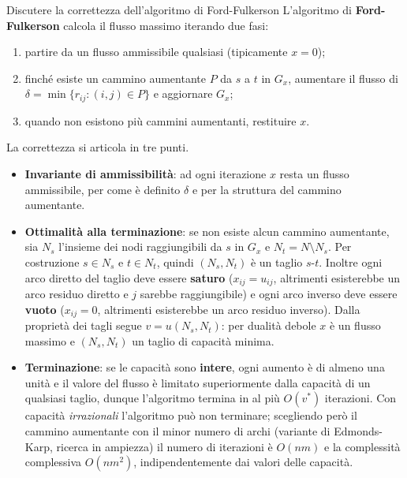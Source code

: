 \documentclass[12pt]{extarticle} %
\begin{document}
\begin{teoriabox}{Discutere la correttezza dell'algoritmo di Ford-Fulkerson}
L'algoritmo di \textbf{Ford-Fulkerson} calcola il flusso massimo iterando due fasi:
\begin{enumerate}
    \item partire da un flusso ammissibile qualsiasi (tipicamente $x = 0$);
    \item finché esiste un cammino aumentante $P$ da $s$ a $t$ in $G_x$, aumentare il flusso di $\delta = \min\{r_{ij} : (i,j) \in P\}$ e aggiornare $G_x$;
    \item quando non esistono più cammini aumentanti, restituire $x$.
\end{enumerate}
La correttezza si articola in tre punti.
\begin{itemize}
    \item \textbf{Invariante di ammissibilità}: ad ogni iterazione $x$ resta un flusso ammissibile, per come è definito $\delta$ e per la struttura del cammino aumentante.
    \item \textbf{Ottimalità alla terminazione}: se non esiste alcun cammino aumentante, sia $N_s$ l'insieme dei nodi raggiungibili da $s$ in $G_x$ e $N_t = N \setminus N_s$. Per costruzione $s \in N_s$ e $t \in N_t$, quindi $(N_s,N_t)$ è un taglio $s$-$t$. Inoltre ogni arco diretto del taglio deve essere \textbf{saturo} ($x_{ij} = u_{ij}$, altrimenti esisterebbe un arco residuo diretto e $j$ sarebbe raggiungibile) e ogni arco inverso deve essere \textbf{vuoto} ($x_{ij} = 0$, altrimenti esisterebbe un arco residuo inverso). Dalla proprietà dei tagli segue $v = u(N_s,N_t)$: per dualità debole $x$ è un flusso massimo e $(N_s,N_t)$ un taglio di capacità minima.
    \item \textbf{Terminazione}: se le capacità sono \textbf{intere}, ogni aumento è di almeno una unità e il valore del flusso è limitato superiormente dalla capacità di un qualsiasi taglio, dunque l'algoritmo termina in al più $O(v^*)$ iterazioni. Con capacità \textit{irrazionali} l'algoritmo può non terminare; scegliendo però il cammino aumentante con il minor numero di archi (variante di Edmonds-Karp, ricerca in ampiezza) il numero di iterazioni è $O(nm)$ e la complessità complessiva $O(nm^2)$, indipendentemente dai valori delle capacità.
\end{itemize}
\end{teoriabox}
\end{document}
